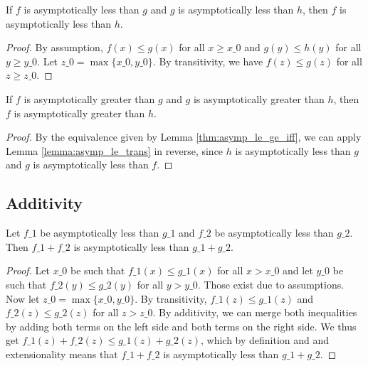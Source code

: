 \begin{lemma}
    \label{lemma:asymp_le_trans}
    \leanok
    If $f$ is asymptotically less than $g$ and $g$ is asymptotically less than $h$,
    then $f$ is asymptotically less than $h$.
\end{lemma}

\begin{proof}
    \leanok
    By assumption, $f(x) \le g(x)$ for all $x \ge x\_0$ and $g(y) \le h(y)$ for all
    $y \ge y\_0$. Let $z\_0 = \max \{ x\_0, y\_0 \}$. By transitivity, we have 
    $f(z) \le g(z)$ for all $z \ge z\_0$.
\end{proof}

\begin{lemma}
    \label{lemma:asymp_ge_trans}
    \leanok
    If $f$ is asymptotically greater than $g$ and $g$ is asymptotically greater than $h$,
    then $f$ is asymptotically greater than $h$.
\end{lemma}

\begin{proof}
    \leanok
    By the equivalence given by Lemma \ref{thm:asymp_le_ge_iff}, we can apply
    Lemma \ref{lemma:asymp_le_trans} in reverse, since $h$ is asymptotically less than
    $g$ and $g$ is asymptotically less than $f$.
\end{proof}


\subsection{Additivity}

\begin{lemma}
    \label{lemma:asymp_le_add}
    \leanok
    Let $f\_1$ be asymptotically less than $g\_1$ and $f\_2$ be asymptotically less
    than $g\_2$. Then $f\_1 + f\_2$ is asymptotically less than $g\_1 + g\_2$.
\end{lemma}

\begin{proof}
    \leanok
    Let $x\_0$ be such that $f\_1(x) \le g\_1(x)$ for all $x > x\_0$ and let $y\_0$ be
    such that $f\_2(y) \le g\_2(y)$ for all $y > y\_0$. Those exist due to assumptions.
    Now let $z\_0 = \max \{ x\_0, y\_0 \}$. By transitivity, $f\_1(z) \le g\_1(z)$ and 
    $f\_2(z) \le g\_2(z)$ for all $z > z\_0$. By additivity, we can merge both 
    inequalities by adding both terms on the left side and both terms on the right side.
    We thus get $f\_1(z) + f\_2(z) \le g\_1(z) + g\_2(z)$, which by definition and 
    and extensionality means that $f\_1 + f\_2$ is asymptotically less than $g\_1 + g\_2$.
\end{proof}

